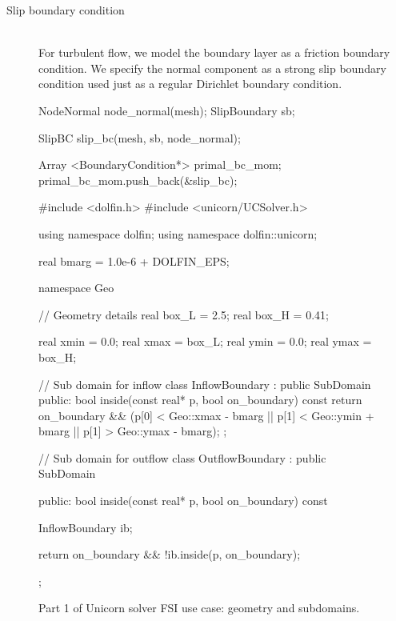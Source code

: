 \begin{description}
\begin{c++}
\end{c++}

\item[Slip boundary condition] \ \\ For turbulent flow, we model the
  boundary layer as a friction boundary condition. We specify the
  normal component as a strong slip boundary condition used just as a
  regular Dirichlet boundary condition.
\begin{c++}
NodeNormal node_normal(mesh);
SlipBoundary sb;

SlipBC slip_bc(mesh, sb, node_normal);

Array <BoundaryCondition*> primal_bc_mom;
primal_bc_mom.push_back(&slip_bc);
\end{c++}

\end{description}

\begin{figure}
\bwfig
\begin{c++}
#include <dolfin.h>
#include <unicorn/UCSolver.h>

using namespace dolfin;
using namespace dolfin::unicorn;

real bmarg = 1.0e-6 + DOLFIN_EPS;

namespace Geo
{
  // Geometry details
  real box_L = 2.5;
  real box_H = 0.41;

  real xmin = 0.0; real xmax = box_L;
  real ymin = 0.0; real ymax = box_H;
}

// Sub domain for inflow
class InflowBoundary : public SubDomain
{
public:
  bool inside(const real* p, bool on_boundary) const
  {
    return on_boundary && (p[0] < Geo::xmax - bmarg ||
                           p[1] < Geo::ymin + bmarg ||
                           p[1] > Geo::ymax - bmarg);
  }
};

// Sub domain for outflow
class OutflowBoundary : public SubDomain
{
public:
  bool inside(const real* p, bool on_boundary) const
  {
    InflowBoundary ib;

    return on_boundary && !ib.inside(p, on_boundary);
  }
};
\end{c++}
\caption{Part 1 of Unicorn solver FSI use case: geometry and subdomains.}
\label{code:UseCasePart1}
\end{figure}

